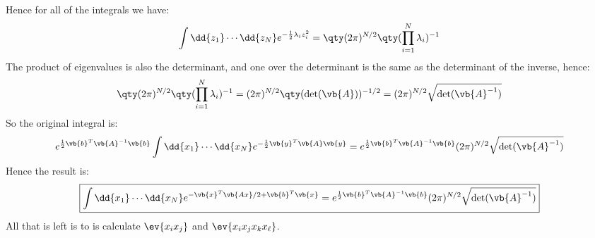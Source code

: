 \documentclass[12pt]{article}
\def\A{\vb{A}}
\begin{document}
Hence for all of the integrals we have:
\begin{align*}
  \int\dd{z_1}\cdots\dd{z_N}e^{-\frac12\lambda_iz_i^2}
  =\qty(2\pi)^{N/2}\qty(\prod_{i=1}^N\lambda_i)^{-1}
\end{align*}
The product of eigenvalues is also the determinant, and one over the determinant is the same as the determinant of the inverse, hence:
\begin{align*}
  \qty(2\pi)^{N/2}\qty(\prod_{i=1}^N\lambda_i)^{-1}=(2\pi)^{N/2}\qty(\det(\A))^{-1/2}
  =(2\pi)^{N/2}\sqrt{\det(\A^{-1})}
\end{align*}
So the original integral is:
\begin{align*}
  e^{\frac12\vb{b}^T\A^{-1}\vb{b}}\int\dd{x_1}\cdots\dd{x_N}e^{-\frac12\vb{y}^T\A\vb{y}}
  =e^{\frac12\vb{b}^T\A^{-1}\vb{b}}(2\pi)^{N/2}\sqrt{\det(\A^{-1})}
\end{align*}
Hence the result is:
\begin{align}
  \boxed{\int\dd{x_1}\cdots\dd{x_N}e^{-\vb{x}^T\vb{Ax}/2+\vb{b}^T\vb{x}}
    =e^{\frac12\vb{b}^T\A^{-1}\vb{b}}(2\pi)^{N/2}\sqrt{\det(\A^{-1})}}
\end{align}
All that is left is to is calculate $\ev{x_ix_j}$ and $\ev{x_ix_jx_kx_\ell}$.
\end{document}
